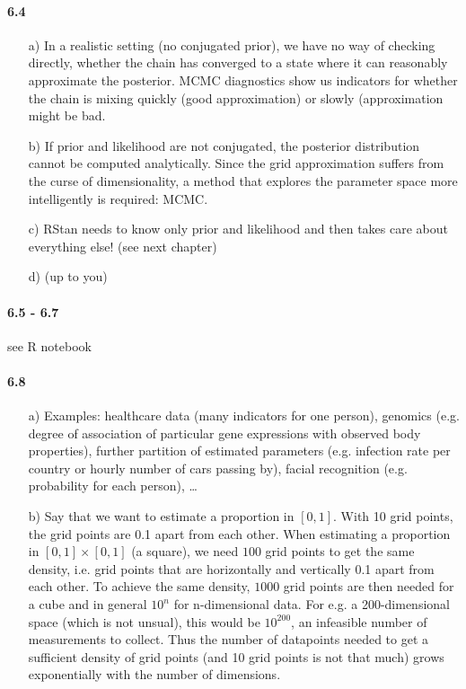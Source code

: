 \documentclass[fontsize=11pt,DIV=18,parskip=half]{scrartcl}
\begin{document}
\paragraph{6.4}
\begin{enumerate}
\item[a)] In a realistic setting (no conjugated prior), we have no way of checking directly, whether the chain has converged to a state where it can reasonably approximate the posterior. MCMC diagnostics show us indicators for whether the chain is mixing quickly (good approximation) or slowly (approximation might be bad.
\item[b)] If prior and likelihood are not conjugated, the posterior distribution cannot be computed analytically. Since the grid approximation suffers from the curse of dimensionality, a method that explores the parameter space more intelligently is required: MCMC.
\item[c)] RStan needs to know only prior and likelihood and then takes care about everything else! (see next chapter)
\item[d)] (up to you)
\end{enumerate}

\paragraph{6.5 - 6.7} see R notebook

\paragraph{6.8}
\begin{enumerate}
\item[a)] Examples: healthcare data (many indicators for one person), genomics (e.g. degree of association of particular gene expressions with observed body properties), further partition of estimated parameters (e.g. infection rate per country or hourly number of cars passing by), facial recognition (e.g. probability for each person), \dots
\item[b)] Say that we want to estimate a proportion in $[0,1]$. With 10 grid points, the grid points are 0.1 apart from each other. When estimating a proportion in $[0,1] \times [0,1]$ (a square), we need $100$ grid points to get the same density, i.e. grid points that are horizontally and vertically 0.1 apart from each other. To achieve the same density, $1000$ grid points are then needed for a cube and in general $10^n$ for n-dimensional data. For e.g. a 200-dimensional space (which is not unsual), this would be $10^{200}$, an infeasible number of measurements to collect. Thus the number of datapoints needed to get a sufficient density of grid points (and 10 grid points is not that much) grows exponentially with the number of dimensions.
\end{enumerate}
\end{document}

